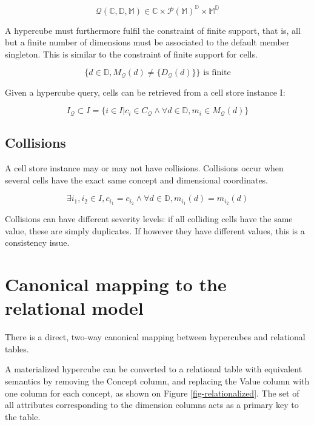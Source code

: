 \documentclass{acm_proc_article-sp}
\begin{document}
$$\mathcal{Q}(\mathbb{C}, \mathbb{D}, \mathbb{M})\in\mathbb{C}\times\mathcal{P}(\mathbb{M})^\mathbb{D}\times\mathbb{M}^\mathbb{D}$$

A hypercube must furthermore fulfil the constraint of finite support, that is, all but a finite number of dimensions must be associated to the default member singleton. This is similar to the constraint of finite support for cells.

$$\{d\in\mathbb{D}, M_\mathcal{Q}(d)\neq\{D_\mathcal{Q}(d)\}\} \text{ is finite}$$

Given a hypercube query, cells can be retrieved from a cell store instance I:

$$I_\mathcal{Q}\subset I=\{i \in I | c_i\in C_\mathcal{Q} \wedge \forall d\in \mathbb{D}, m_i\in M_\mathcal{Q}(d)\}$$ 

\subsection{Collisions}

A cell store instance may or may not have collisions. Collisions occur when several cells have the exact same concept and dimensional coordinates.

$$\exists i_1, i_2 \in I, c_{i_1}=c_{i_2} \wedge \forall d \in \mathbb{D}, m_{i_1}(d)=m_{i_2}(d)$$

Collisions can have different severity levels: if all colliding cells have the same value, these are simply duplicates. If however they have different values, this is a consistency issue.

\section{Canonical mapping to the relational model}
\label{section-relational-mapping}
There is a direct, two-way canonical mapping between hypercubes and relational tables.

A materialized hypercube can be converted to a relational table with equivalent semantics by removing the Concept column, and replacing the Value column with one column for each concept, as shown on Figure \ref{fig-relationalized}. The set of all attributes corresponding to the dimension columns acts as a primary key to the table.
\end{document}
